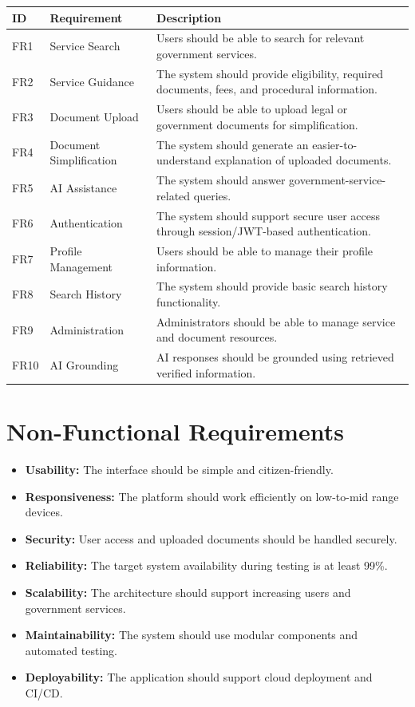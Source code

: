 \documentclass[12pt,a4paper]{report}
\begin{document}
\begin{longtable}{p{1.2cm}p{4.5cm}p{8cm}}
\toprule
\textbf{ID} & \textbf{Requirement} & \textbf{Description} \\
\midrule
FR1 & Service Search & Users should be able to search for relevant government services. \\
FR2 & Service Guidance & The system should provide eligibility, required documents, fees, and procedural information. \\
FR3 & Document Upload & Users should be able to upload legal or government documents for simplification. \\
FR4 & Document Simplification & The system should generate an easier-to-understand explanation of uploaded documents. \\
FR5 & AI Assistance & The system should answer government-service-related queries. \\
FR6 & Authentication & The system should support secure user access through session/JWT-based authentication. \\
FR7 & Profile Management & Users should be able to manage their profile information. \\
FR8 & Search History & The system should provide basic search history functionality. \\
FR9 & Administration & Administrators should be able to manage service and document resources. \\
FR10 & AI Grounding & AI responses should be grounded using retrieved verified information. \\
\bottomrule
\end{longtable}

\section{Non-Functional Requirements}

\begin{itemize}[leftmargin=*]
    \item \textbf{Usability:} The interface should be simple and citizen-friendly.
    \item \textbf{Responsiveness:} The platform should work efficiently on low-to-mid range devices.
    \item \textbf{Security:} User access and uploaded documents should be handled securely.
    \item \textbf{Reliability:} The target system availability during testing is at least 99\%.
    \item \textbf{Scalability:} The architecture should support increasing users and government services.
    \item \textbf{Maintainability:} The system should use modular components and automated testing.
    \item \textbf{Deployability:} The application should support cloud deployment and CI/CD.
\end{itemize}
\end{document}
